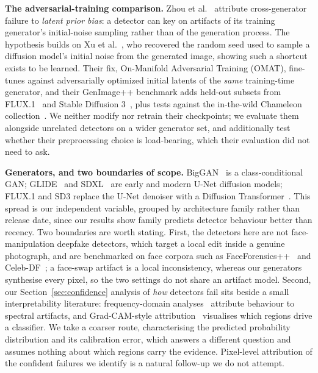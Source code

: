 \documentclass[3p,times,procedia]{elsarticle}
\begin{document}
\textbf{The adversarial-training comparison.} Zhou et
al.~\cite{zhou2025omat} attribute cross-generator failure to \emph{latent
prior bias}: a detector can key on artifacts of its training generator's
initial-noise sampling rather than of the generation process. The
hypothesis builds on Xu et al.~\cite{xu2025seeds}, who recovered the random
seed used to sample a diffusion model's initial noise from the generated
image, showing such a shortcut exists to be learned. Their fix, On-Manifold
Adversarial Training (OMAT), fine-tunes against adversarially optimized
initial latents of the \emph{same} training-time generator, and their
GenImage++ benchmark adds held-out subsets from FLUX.1~\cite{flux2024} and
Stable Diffusion 3~\cite{esser2024sd3}, plus tests against the in-the-wild
Chameleon collection~\cite{yan2024chameleon}. We neither modify nor retrain
their checkpoints; we evaluate them alongside unrelated detectors on a
wider generator set, and additionally test whether their preprocessing
choice is load-bearing, which their evaluation did not need to ask.

\textbf{Generators, and two boundaries of scope.}
BigGAN~\cite{brock2019biggan} is a class-conditional GAN;
GLIDE~\cite{nichol2021glide} and SDXL~\cite{podell2023sdxl} are early and
modern U-Net diffusion models; FLUX.1 and SD3 replace the U-Net denoiser
with a Diffusion Transformer~\cite{peebles2023dit}. This spread is our independent
variable, grouped by architecture family rather than release date, since
our results show family predicts detector behaviour better than recency.
Two boundaries are worth stating. First, the detectors here are not
face-manipulation deepfake detectors, which target a local edit inside a
genuine photograph, and are benchmarked on face corpora such as
FaceForensics++~\cite{rossler2019ff} and Celeb-DF~\cite{li2020celebdf}; a
face-swap artifact is a local inconsistency, whereas our generators
synthesise every pixel, so the two settings do not share an artifact
model. Second, our
Section~\ref{sec:confidence} analysis of \emph{how} detectors fail sits
beside a small interpretability literature: frequency-domain
analyses~\cite{qian2020freq,frank2020leveraging} attribute behaviour to
spectral artifacts, and Grad-CAM-style
attribution~\cite{selvaraju2017gradcam} visualises which regions drive a
classifier. We take a coarser route, characterising the predicted
probability distribution and its calibration error, which answers a
different question and assumes nothing about which regions carry the
evidence. Pixel-level attribution of the confident failures we identify is
a natural follow-up we do not attempt.
\end{document}
